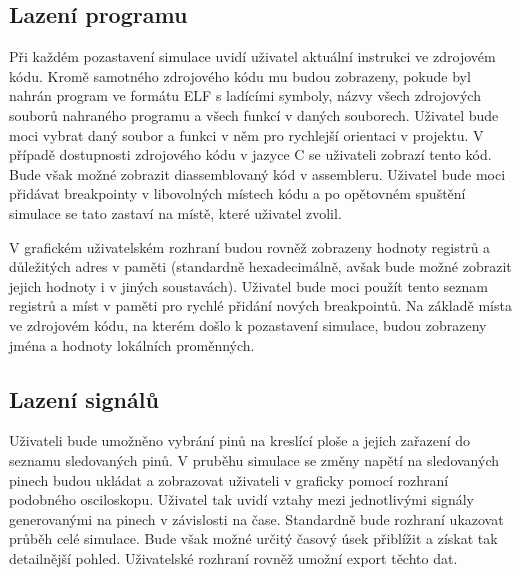 \subsection{Lazení programu}

Při každém pozastavení simulace uvidí uživatel aktuální instrukci ve zdrojovém kódu. Kromě samotného zdrojového kódu mu budou zobrazeny, pokude byl nahrán program ve formátu ELF s ladícími symboly, názvy všech zdrojových souborů nahraného programu a všech funkcí v daných souborech. Uživatel bude moci vybrat daný soubor a funkci v něm pro rychlejší orientaci v projektu. V případě dostupnosti zdrojového kódu v jazyce C se uživateli zobrazí tento kód. Bude však možné zobrazit diassemblovaný kód v assembleru. Uživatel bude moci přidávat breakpointy v libovolných místech kódu a po opětovném spuštění simulace se tato zastaví na místě, které uživatel zvolil.

V grafickém uživatelském rozhraní budou rovněž zobrazeny hodnoty registrů a důležitých adres v paměti (standardně hexadecimálně, avšak bude možné zobrazit jejich hodnoty i v jiných soustavách). Uživatel bude moci použít tento seznam registrů a míst v paměti pro rychlé přidání nových breakpointů. Na základě místa ve zdrojovém kódu, na kterém došlo k pozastavení simulace, budou zobrazeny jména a hodnoty lokálních proměnných.

\subsection{Lazení signálů}

Uživateli bude umožněno vybrání pinů na kreslící ploše a jejich zařazení do seznamu sledovaných pinů. V pruběhu simulace se změny napětí na sledovaných pinech budou ukládat a zobrazovat uživateli v graficky pomocí rozhraní podobného osciloskopu. Uživatel tak uvidí vztahy mezi jednotlivými signály generovanými na pinech v závislosti na čase. Standardně bude rozhraní ukazovat průběh celé simulace. Bude však možné určitý časový úsek přiblížit a získat tak detailnější pohled. Uživatelské rozhraní rovněž umožní export těchto dat.
